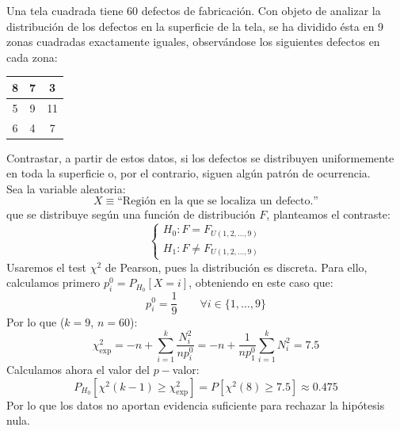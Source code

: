\begin{ejercicio}
   Una tela cuadrada tiene 60 defectos de fabricación. Con objeto de analizar la distribución de los defectos en la superficie de la tela, se ha dividido ésta en 9 zonas cuadradas exactamente iguales, observándose los siguientes defectos en cada zona: 
   \begin{table}[H]
   \centering
   \begin{tabular}{|c|c|c|}
       \hline
       8 & 7 & 3 \\
       \hline
       5 & 9 & 11 \\
       \hline
       6 & 4 & 7 \\
       \hline
   \end{tabular}
   \end{table}
   \noindent
   Contrastar, a partir de estos datos, si los defectos se distribuyen uniformemente en toda la superficie o, por el contrario, siguen algún patrón de ocurrencia.\\

   \noindent
   Sea la variable aleatoria:
   \begin{equation*}
       X\equiv \text{``Región en la que se localiza un defecto.''} 
   \end{equation*}
   que se distribuye según una función de distribución $F$, planteamos el contraste:
   \begin{equation*}
       \left\{\begin{array}{l}
           H_0: F=F_{U(1,2,\ldots,9)} \\
           H_1: F\neq F_{U(1,2,\ldots,9)}
       \end{array}\right.
   \end{equation*}
   Usaremos el test $\chi^2$ de Pearson, pues la distribución es discreta. Para ello, calculamos primero $p_i^0 = P_{H_0}[X = i]$, obteniendo en este caso que:
   \begin{equation*}
       p_i^0 = \frac{1}{9} \qquad \forall i \in \{1,\ldots,9\}
   \end{equation*}
   Por lo que ($k = 9$, $n=60$):
   \begin{equation*}
       \chi^2_{\text{exp}} = -n + \sum_{i=1}^{k} \frac{N_i^2}{np_i^0} = -n + \frac{1}{np_1^0}\sum_{i=1}^{k} N_i^2 = 7.5
   \end{equation*}
   Calculamos ahora el valor del $p-$valor:
   \begin{equation*}
       P_{H_0}[\chi^2(k-1)\geq \chi^2_{\text{exp}}] = P[\chi^2(8)\geq 7.5] \approx 0.475
   \end{equation*}
   Por lo que los datos no aportan evidencia suficiente para rechazar la hipótesis nula.
\end{ejercicio}

